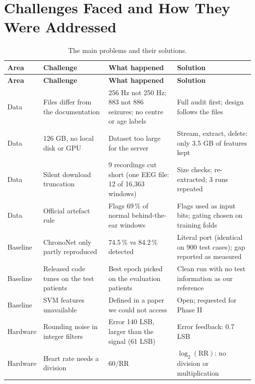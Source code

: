 \chapter{Challenges Faced and How They Were Addressed}\label{ch:challenges}

\begin{xltabular}{\textwidth}{@{}P{17mm}P{40mm}LL@{}}
\caption{The main problems and their solutions.}\label{tab:challenges}\\
\toprule
\textbf{Area} & \textbf{Challenge} & \textbf{What happened} & \textbf{Solution}\\
\midrule
\endfirsthead
\toprule
\textbf{Area} & \textbf{Challenge} & \textbf{What happened} & \textbf{Solution}\\
\midrule
\endhead
\bottomrule
\endlastfoot
\small Data & \small Files differ from the documentation & \small 256 Hz not 250 Hz; 883 not 886 seizures; no centre
or age labels & \small Full audit first; design follows the files\\
\small Data & \small 126 GB, no local disk or GPU & \small Dataset too large for the server & \small Stream, extract,
delete: only 3.5 GB of features kept\\
\small Data & \small Silent download truncation & \small 9 recordings cut short (one EEG file: 12 of 16,363 windows) &
\small Size checks; re-extracted; 3 runs repeated\\
\small Data & \small Official artefact rule & \small Flags 69\,\% of normal behind-the-ear windows & \small Flags used
as input bits; gating chosen on training folds\\
\small Baseline & \small ChronoNet only partly reproduced & \small 74.5\,\% vs 84.2\,\% detected & \small Literal port
(identical on 900 test cases); gap reported as measured\\
\small Baseline & \small Released code tunes on the test patients & \small Best epoch picked on the evaluation
patients & \small Clean run with no test information as our reference\\
\small Baseline & \small SVM features unavailable & \small Defined in a paper we could not access & \small Open;
requested for Phase II\\
\small Hardware & \small Rounding noise in integer filters & \small Error 140 LSB, larger than the signal (61 LSB) &
\small Error feedback: 0.7 LSB\\
\small Hardware & \small Heart rate needs a division & \small $60/\mathrm{RR}$ & \small $\log_2(\mathrm{RR})$: no
division or multiplication\\

\end{xltabular}
